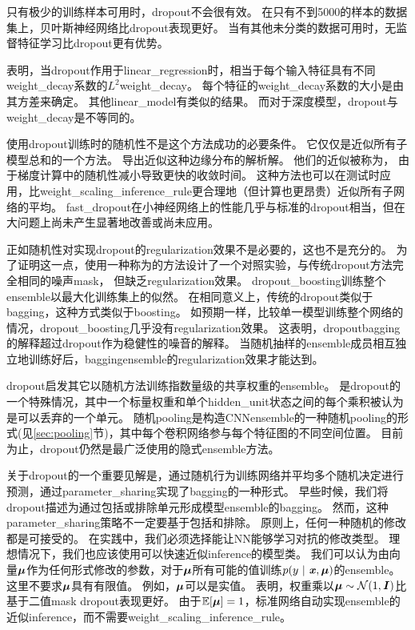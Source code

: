 只有极少的训练样本可用时，\gls{dropout}不会很有效。
在只有不到5000的样本的数据集上\citep{Xiong2011}，贝叶斯神经网络\citep{Neal1996}比\gls{dropout}表现更好\citep{Srivastava14}。
当有其他未分类的数据可用时，无监督特征学习比\gls{dropout}更有优势。


\cite{Wager+al-2013}表明，当\gls{dropout}作用于\gls{linear_regression}时，相当于每个输入特征具有不同\gls{weight_decay}系数的$L^2$\gls{weight_decay}。 每个特征的\gls{weight_decay}系数的大小是由其方差来确定。
其他\gls{linear_model}有类似的结果。
而对于深度模型，\gls{dropout}与\gls{weight_decay}是不等同的。


使用\gls{dropout}训练时的随机性不是这个方法成功的必要条件。
它仅仅是近似所有子模型总和的一个方法。
\cite{WangManning-ICML2013-small}导出近似这种边缘分布的解析解。
他们的近似被称为， 由于梯度计算中的随机性减小导致更快的收敛时间。
这种方法也可以在测试时应用，比\gls{weight_scaling_inference_rule}更合理地（但计算也更昂贵）近似所有子网络的平均。
\gls{fast_dropout}在小神经网络上的性能几乎与标准的\gls{dropout}相当，但在大问题上尚未产生显著地改善或尚未应用。


正如随机性对实现\gls{dropout}的\gls{regularization}效果不是必要的，这也不是充分的。
为了证明这一点，\cite{WardeFarley+al-ICLR2014}使用一种称为的方法设计了一个对照实验，与传统\gls{dropout}方法完全相同的噪声\gls{mask}， 但缺乏\gls{regularization}效果。
\gls{dropout_boosting}训练整个\gls{ensemble}以最大化训练集上的似然。
在相同意义上，传统的\gls{dropout}类似于\gls{bagging}，这种方式类似于\gls{boosting}。
如预期一样，比较单一模型训练整个网络的情况，\gls{dropout_boosting}几乎没有\gls{regularization}效果。
这表明，\gls{dropout}\gls{bagging}的解释超过\gls{dropout}作为稳健性的噪音的解释。
当随机抽样的\gls{ensemble}成员相互独立地训练好后，\gls{bagging}\gls{ensemble}的\gls{regularization}效果才能达到。

\gls{dropout}启发其它以随机方法训练指数量级的共享权重的\gls{ensemble}。
是\gls{dropout}的一个特殊情况，其中一个标量权重和单个\gls{hidden_unit}状态之间的每个乘积被认为是可以丢弃的一个单元\citep{Wan+al-ICML2013-small}。
随机\gls{pooling}是构造\gls{CNN}\gls{ensemble}的一种随机\gls{pooling}的形式(见\ref{sec:pooling}节)，其中每个卷积网络参与每个特征图的不同空间位置。
目前为止，\gls{dropout}仍然是最广泛使用的隐式\gls{ensemble}方法。

关于\gls{dropout}的一个重要见解是，通过随机行为训练网络并平均多个随机决定进行预测，通过\gls{parameter_sharing}实现了\gls{bagging}的一种形式。
早些时候，我们将\gls{dropout}描述为通过包括或排除单元形成模型\gls{ensemble}的\gls{bagging}。
然而，这种\gls{parameter_sharing}策略不一定要基于包括和排除。
原则上，任何一种随机的修改都是可接受的。
在实践中，我们必须选择能让\gls{NN}能够学习对抗的修改类型。
理想情况下，我们也应该使用可以快速近似\gls{inference}的模型类。
我们可以认为由向量$\boldsymbol{\mu}$作为任何形式修改的参数，对于$\boldsymbol{\mu}$所有可能的值训练$p(y ~|~ \boldsymbol{\mathit{x}}, \boldsymbol{\mu})$的\gls{ensemble}。
这里不要求$\boldsymbol{\mu}$具有有限值。
例如，$\boldsymbol{\mu}$可以是实值。
\cite{Srivastava14}表明，权重乘以$\boldsymbol{\mu} \sim \mathcal{N}(1, \boldsymbol{\mathit{I}})$比基于二值\gls{mask} \gls{dropout}表现更好。
由于$\mathbb{E}[\boldsymbol{\mu}] = 1$，标准网络自动实现\gls{ensemble}的近似\gls{inference}，而不需要\gls{weight_scaling_inference_rule}。

